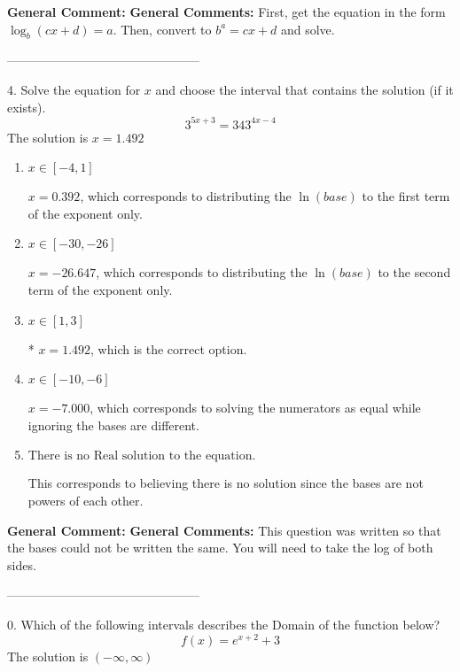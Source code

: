 \documentclass{extbook}[14pt]
\begin{document}
\textbf{General Comment:} \textbf{General Comments:} First, get the equation in the form $\log_b{(cx+d)} = a$. Then, convert to $b^a = cx+d$ and solve. 

-----------------------------------------------

4. Solve the equation for $x$ and choose the interval that contains the solution (if it exists).
\[ 3^{5x+3} = 343^{4x-4} \] 
The solution is $ x = 1.492 $ 

\begin{enumerate}[label=\Alph*.] 
\item $ x \in [-4, 1] $ 

 $x = 0.392$, which corresponds to distributing the $\ln(base)$ to the first term of the exponent only. 
\item $ x \in [-30, -26] $ 

 $x = -26.647$, which corresponds to distributing the $\ln(base)$ to the second term of the exponent only. 
\item $ x \in [1, 3] $ 

 * $x = 1.492$, which is the correct option. 
\item $ x \in [-10, -6] $ 

 $x = -7.000$, which corresponds to solving the numerators as equal while ignoring the bases are different. 
\item $ \text{There is no Real solution to the equation.} $ 

 This corresponds to believing there is no solution since the bases are not powers of each other. 
\end{enumerate} 
 
\textbf{General Comment:} \textbf{General Comments:} This question was written so that the bases could not be written the same. You will need to take the log of both sides. 

-----------------------------------------------

0. Which of the following intervals describes the Domain of the function below?
\[ f(x) = e^{x+2}+3 \] 
The solution is $ (-\infty, \infty) $ 
\end{document}

